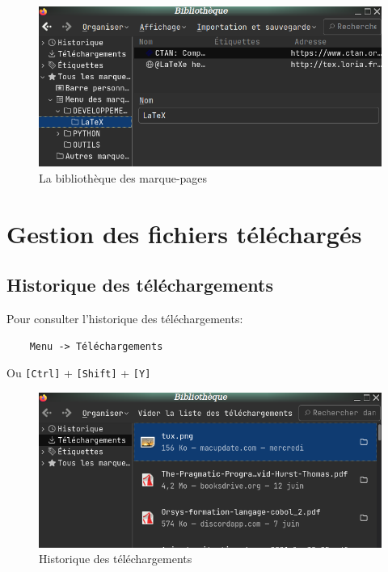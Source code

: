 \documentclass[a4paper,11pt]{book}
\begin{document}
\begin{figure}[!h]
\begin{center}
\includegraphics[scale=0.5]{IMG/008--Bibliotheque.png}
\caption{La bibliothèque des marque-pages}
\end{center}
\end{figure}
\medskip

\section{Gestion des fichiers téléchargés}
\subsection*{Historique des téléchargements}
\label{Telecharge}
Pour consulter l'historique des téléchargements:
\begin{verbatim}
    Menu -> Téléchargements
\end{verbatim}
\medskip

Ou \texttt{[Ctrl]} + \texttt{[Shift]} + \texttt{[Y]}
\medskip

\begin{figure}[!h]
\begin{center}
\includegraphics[scale=0.5]{IMG/004-Telechargement.png}
\caption{Historique des téléchargements}
\end{center}
\end{figure}
\medskip
\end{document}
